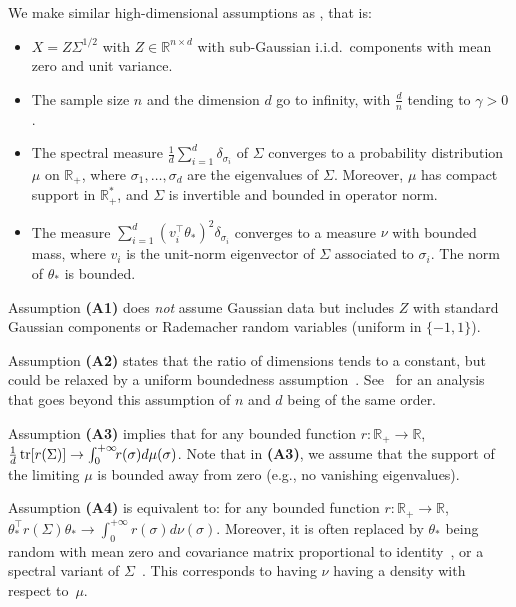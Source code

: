 \documentclass[11pt]{article}
\newcommand{\BIT}{\begin{itemize}}
\newcommand{\EIT}{\end{itemize}}
\newcommand{\tr}{\mathop{ \rm tr}}
\newcommand{\rb}{\mathbb{R}}
\def \S{  { \Sigma} }
\begin{document}
We make similar high-dimensional assumptions as \cite{dobriban2018high,richards2021asymptotics}, that is:
\BIT
\item[\textbf{(A1)}] $X =  Z \S^{1/2}$ with $Z \in \rb^{n\times d}$ with sub-Gaussian i.i.d.~components with mean zero and unit variance.

\item[\textbf{(A2)}] The sample size $n$ and the dimension $d$ go to infinity, with $  \frac{d}{n}$ tending to $\gamma > 0$.

\item[\textbf{(A3)}] The spectral measure 
$  \frac{1}{d} \sum_{i=1}^d   \delta_{\sigma_i}$
of $\S$ converges to a probability distribution $\mu$ on $\rb_+$, where $\sigma_1,\dots,\sigma_d$ are the eigenvalues of $\S$. Moreover, $\mu$ has compact support in $\rb_+^\ast$, and $\S $ is invertible and bounded in operator norm.

\item[\textbf{(A4)}] The measure $   \sum_{i=1}^d ( v_i ^\top \theta_\ast)^2 \delta_{\sigma_i}$ converges to a measure $\nu$ with bounded mass, where $v_i$ is the unit-norm eigenvector of $\S$ associated to $\sigma_i$. The norm of $\theta_\ast$ is bounded.

\EIT

Assumption \textbf{(A1)} does \emph{not} assume Gaussian data but includes $Z$ with standard Gaussian components or Rademacher random variables (uniform in $\{-1,1\}$).

Assumption \textbf{(A2)} states that the ratio of dimensions tends to a constant, but could be relaxed by a uniform boundedness assumption~\cite{rubio2011spectral}. See~\cite{cheng2022dimension} for an analysis that goes beyond this assumption of $n$ and $d$ being of the same order.


Assumption \textbf{(A3)} implies that for any bounded function $r: \rb_+ \to \rb$, $  \frac{1}{d} \tr [ r(\Sigma)] 
\to \int_0^{+\infty}\!\! r(\sigma) d\mu(\sigma)$.
Note that in  \textbf{(A3)}, we assume that the support of the limiting $\mu$ is bounded away from zero (e.g., no vanishing eigenvalues).


Assumption \textbf{(A4)} is equivalent to: for any bounded function $r: \rb_+ \to \rb$, $  \theta_\ast^\top r(\S) \theta_\ast \to \int_0^{+\infty} \!\! r(\sigma) d\nu(\sigma)$.
Moreover, it is often replaced by $\theta_\ast$ being random with mean zero and covariance matrix proportional to identity~\cite{dobriban2018high}, or a spectral variant of $\S$~\cite{richards2021asymptotics}. This corresponds to having $\nu$ having a density with respect to~$\mu$.
\end{document}
